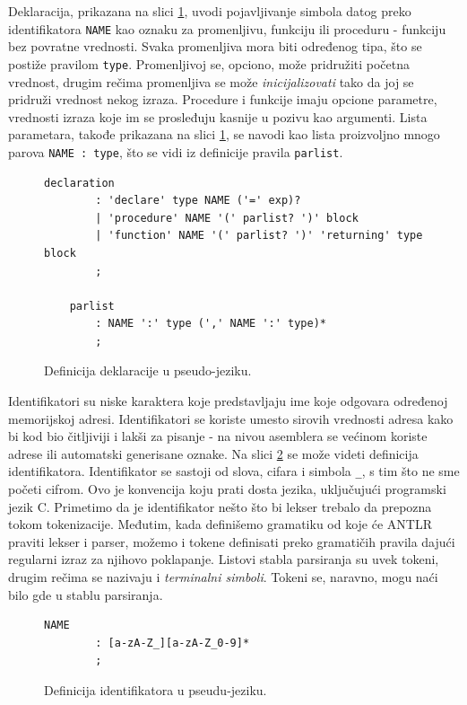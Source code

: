 Deklaracija, prikazana na slici \ref{fig:PseudoDef3}, uvodi pojavljivanje simbola datog preko identifikatora \texttt{NAME} kao oznaku za promenljivu, funkciju ili proceduru - funkciju bez povratne vrednosti. Svaka promenljiva mora biti određenog tipa, što se postiže pravilom \texttt{type}. Promenljivoj se, opciono, može pridružiti početna vrednost, drugim rečima promenljiva se može \emph{inicijalizovati} tako da joj se pridruži vrednost nekog izraza. Procedure i funkcije imaju opcione parametre, vrednosti izraza koje im se prosleđuju kasnije u pozivu kao argumenti. Lista parametara, takođe prikazana na slici \ref{fig:PseudoDef3}, se navodi kao lista proizvoljno mnogo parova \texttt{NAME : type}, što se vidi iz definicije pravila \texttt{parlist}.

\begin{figure}[h!]
    \begin{lstlisting}[language={}]
    declaration
        : 'declare' type NAME ('=' exp)? 
        | 'procedure' NAME '(' parlist? ')' block 
        | 'function' NAME '(' parlist? ')' 'returning' type block 
        ;

    parlist
        : NAME ':' type (',' NAME ':' type)*
        ;
    \end{lstlisting}
    \caption{Definicija deklaracije u pseudo-jeziku.}
    \label{fig:PseudoDef3}
\end{figure}

Identifikatori su niske karaktera koje predstavljaju ime koje odgovara određenoj memorijskoj adresi. Identifikatori se koriste umesto sirovih vrednosti adresa kako bi kod bio čitljiviji i lakši za pisanje - na nivou asemblera se većinom koriste adrese ili automatski generisane oznake. Na slici \ref{fig:PseudoDef4} se može videti definicija identifikatora. Identifikator se sastoji od slova, cifara i simbola \texttt{\_}, s tim što ne sme početi cifrom. Ovo je konvencija koju prati dosta jezika, uključujući programski jezik C. Primetimo da je identifikator nešto što bi lekser trebalo da prepozna tokom tokenizacije. Međutim, kada definišemo gramatiku od koje će ANTLR praviti lekser i parser, možemo i tokene definisati preko gramatičih pravila dajući regularni izraz za njihovo poklapanje. Listovi stabla parsiranja su uvek tokeni, drugim rečima se nazivaju i \emph{terminalni simboli}. Tokeni se, naravno, mogu naći bilo gde u stablu parsiranja.

\begin{figure}[h!]
    \begin{lstlisting}[language={}]
    NAME
        : [a-zA-Z_][a-zA-Z_0-9]*
        ;
    \end{lstlisting}
    \caption{Definicija identifikatora u pseudu-jeziku.}
    \label{fig:PseudoDef4}
\end{figure}

